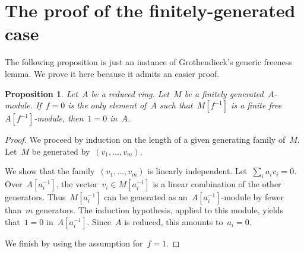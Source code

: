 \documentclass{amsart}
\theoremstyle{definition}
\theoremstyle{plain}
\newtheorem{prop}[defn]{Proposition}
\theoremstyle{remark}
\begin{document}
\section{The proof of the finitely-generated case}

The following proposition is just an instance of Grothendieck's generic
freeness lemma. We prove it here because it admits an easier proof.

\begin{prop}Let~$A$ be a reduced ring. Let~$M$ be a finitely
generated~$A$-module. If~$f = 0$ is the only element of~$A$ such
that~$M[f^{-1}]$ is a finite free~$A[f^{-1}]$-module, then~$1 = 0$ in~$A$.
\end{prop}

\begin{proof}We proceed by induction on the length of a given generating family
of~$M$. Let~$M$ be generated by~$(v_1,\ldots,v_m)$.

We show that the family~$(v_1,\ldots,v_m)$ is linearly independent. Let~$\sum_i
a_i v_i = 0$. Over~$A[a_i^{-1}]$, the vector~$v_i \in M[a_i^{-1}]$ is a linear
combination of the other generators. Thus~$M[a_i^{-1}]$ can be generated as
an~$A[a_i^{-1}]$-module by fewer than~$m$ generators. The induction hypothesis,
applied to this module, yields that~$1 = 0$ in~$A[a_i^{-1}]$. Since~$A$ is
reduced, this amounts to~$a_i = 0$.

We finish by using the assumption for~$f = 1$.
\end{proof}
\end{document}
